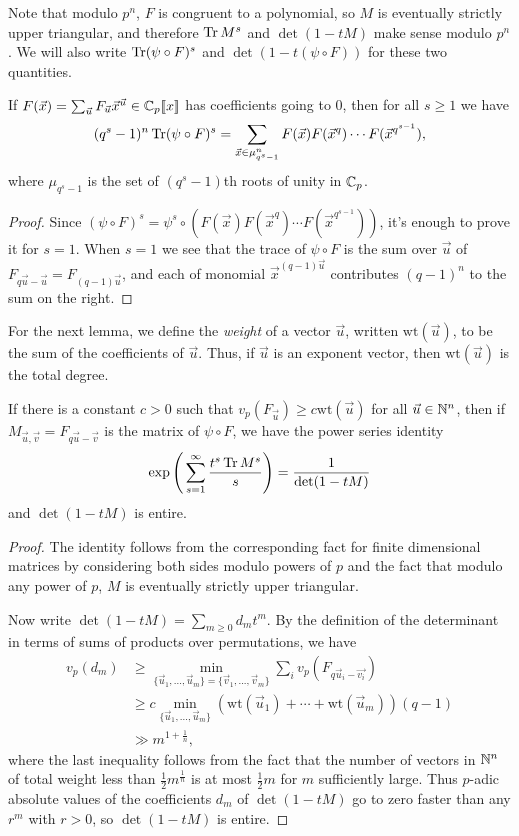 Note that modulo $p^n$, $F$ is congruent to a polynomial, so $M$ is eventually strictly upper triangular, and therefore $\operatorname{Tr} M^s$ and $\det(1-tM)$ make sense modulo $p^n$. We will also write $\operatorname{Tr} (\psi \circ F)^s$ and $\det(1-t(\psi\circ F))$ for these two quantities.

\begin{lem} If $F(\vec{x}) = \sum_{\vec{u}} F_{\vec{u}} \vec{x}^{\vec{u}} \in \mathbb{C}_p[\![x]\!]$ has coefficients going to $0$, then for all $s \ge 1$ we have
\[
(q^s-1)^n \operatorname{Tr} (\psi \circ F)^s = \sum_{\vec{x} \in \mu_{q^s-1}^n} F(\vec{x})F(\vec{x}^q) \cdots F(\vec{x}^{q^{s-1}}),
\]
where $\mu_{q^s-1}$ is the set of $(q^s-1)$th roots of unity in $\mathbb{C}_p$.
\end{lem}
\begin{proof} Since $(\psi\circ F)^s = \psi^s \circ (F(\vec{x})F(\vec{x}^q)\cdots F(\vec{x}^{q^{s-1}}))$, it's enough to prove it for $s = 1$. When $s = 1$ we see that the trace of $\psi\circ F$ is the sum over $\vec{u}$ of $F_{q\vec{u}-\vec{u}} = F_{(q-1)\vec{u}}$, and each of monomial $\vec{x}^{(q-1)\vec{u}}$ contributes $(q-1)^n$ to the sum on the right.
\end{proof}

For the next lemma, we define the \emph{weight} of a vector $\vec{u}$, written $\mbox{wt}(\vec{u})$, to be the sum of the coefficients of $\vec{u}$. Thus, if $\vec{u}$ is an exponent vector, then $\mbox{wt}(\vec{u})$ is the total degree.

\begin{lem} If there is a constant $c > 0$ such that $v_p(F_{\vec{u}}) \ge c\mbox{wt}(\vec{u})$ for all $\vec{u} \in \mathbb{N}^n$, then if $M_{\vec{u},\vec{v}} = F_{q\vec{u}-\vec{v}}$ is the matrix of $\psi\circ F$, we have the power series identity
\[
\exp\Bigg(\sum_{s=1}^{\infty} \frac{t^s\operatorname{Tr} M^s}{s}\Bigg) = \frac{1}{\det(1-tM)}
\]
and $\det(1-tM)$ is entire.
\end{lem}
\begin{proof} The identity follows from the corresponding fact for finite dimensional matrices by considering both sides modulo powers of $p$ and the fact that modulo any power of $p$, $M$ is eventually strictly upper triangular.

Now write $\det(1-tM) = \sum_{m\ge 0} d_mt^m$. By the definition of the determinant in terms of sums of products over permutations, we have
\begin{align*}
v_p(d_m) &\ge \min_{\{\vec{u}_1, ..., \vec{u}_m\} = \{\vec{v}_1, ..., \vec{v}_m\}} \sum_i v_p(F_{q\vec{u}_i-\vec{v_i}})\\
&\ge c\min_{\{\vec{u}_1, ..., \vec{u}_m\}} (\mbox{wt}(\vec{u}_1) + \cdots + \mbox{wt}(\vec{u}_m))(q-1)\\
&\gg m^{1+\tfrac{1}{n}},
\end{align*}
where the last inequality follows from the fact that the number of vectors in $\mathbb{N}^n$ of total weight less than $\frac{1}{2}m^{\frac{1}{n}}$ is at most $\frac{1}{2}m$ for $m$ sufficiently large. Thus $p$-adic absolute values of the coefficients $d_m$ of $\det(1-tM)$ go to zero faster than any $r^m$ with $r > 0$, so $\det(1-tM)$ is entire.
\end{proof}

